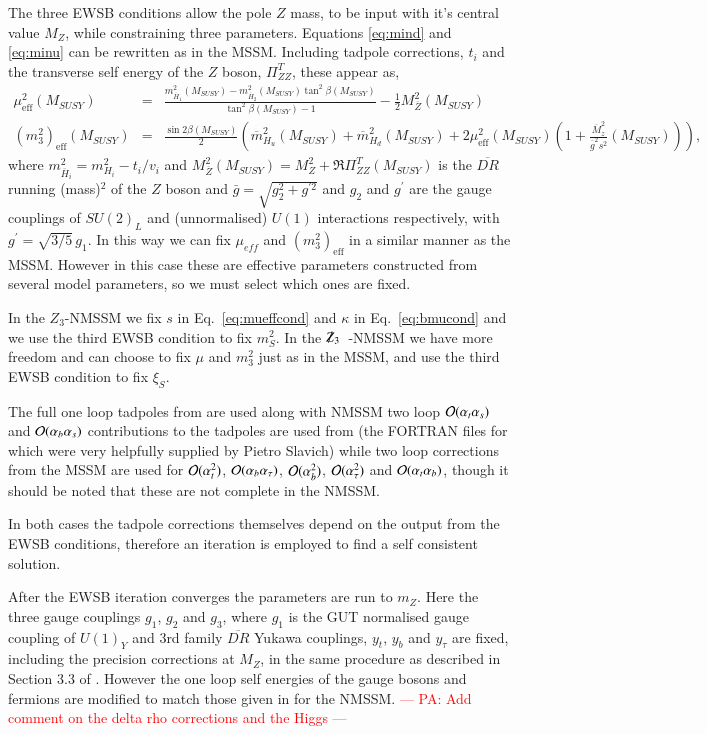 \documentclass[final,3p,times,pdflatex]{elsarticle}
\newcommand{\ba}{\begin{eqnarray}}
\newcommand{\ea}{\end{eqnarray}}
\newcommand{\Zv}{{\mbox{$\slashed{Z}_{3}$}\ }} %
\def\at{\alpha_t}
\def\ab{\alpha_b}
\def\as{\alpha_s}
\def\atau{\alpha_{\tau}}
\def\oatab{{\cal O}(\at\ab)}
\def\oatas{{\cal O}(\at\as)}
\def\oabas{{\cal O}(\ab\as)}
\def\oatq{{\cal O}(\at^2)}
\def\oabq{{\cal O}(\ab^2)}
\def\oatauq{{\cal O}(\atau^2)}
\def\oabatau{{\cal O}(\ab \atau)}
\begin{document}
   The three EWSB conditions allow the pole $Z$ mass, to be input with
   it's central value $M_Z$, while constraining three parameters.
   Equations \ref{eq:mind} and \ref{eq:minu} can be rewritten as in
   the MSSM.  Including tadpole corrections, $t_i$ and the transverse
   self energy of the $Z$ boson, $\Pi^T_{ZZ}$, these appear as, \ba
   \mu_\textrm{eff}^2(M_{SUSY}) &=&
   \frac{m_{\overline{H}_1}^2(M_{SUSY}) -
     m_{\overline{H}_2}^2(M_{SUSY}) \tan^2 \beta(M_{SUSY})}{\tan^2
     \beta(M_{SUSY}) - 1} - \frac{1}{2} M_{\overline Z}^2
   (M_{SUSY})\label{eq:mueffcond}\\ (m^2_3)_\textrm{eff}(M_{SUSY})&=&\frac{\sin{2\beta}(M_{SUSY})}{2}\left(\overline{m}_{H_u}^2(M_{SUSY})+\overline{m}_{H_d}^2(M_{SUSY})+
   2\mu_\textrm{eff}^2(M_{SUSY})\left(1+\frac{\overline{M}_z^2}{\overline{g}^2s^2}(M_{SUSY})\right)\right),\label{eq:bmucond}
   \ea where $m_{\overline{H}_i}^2 = m_{H_i}^2 - t_i/v_i$ and
   $M_{\overline Z}^2(M_{SUSY}) = M_Z^2 + \Re\Pi_{ZZ}^T(M_{SUSY})$ is
   the $\overline{DR}$ running (mass)$^2$ of the $Z$ boson and $\bar g
   = \sqrt{g_2^2+g^{\prime 2}}$ and $g_2$ and $g^{\prime}$ are the
   gauge couplings of $SU(2)_L$ and (unnormalised) $U(1)$ interactions
   respectively, with $g^\prime = \sqrt{3/5} \, g_1$.  In this way we
   can fix $\mu_{eff}$ and $(m^2_3)_\textrm{eff}$ in a similar manner
   as the MSSM.  However in this case these are effective parameters
   constructed from several model parameters, so we must select which
   ones are fixed.

In the $Z_3$-NMSSM we fix $s$ in Eq.~\ref{eq:mueffcond} and $\kappa$
in Eq.~\ref{eq:bmucond} and we use the third EWSB condition to fix
$m_S^2$.  In the \Zv-NMSSM we have more freedom and can choose to fix
$\mu$ and $m_3^2$ just as in the MSSM, and use the third EWSB
condition to fix $\xi_S$.

The full one loop tadpoles from \cite{Degrassi:2009yq} are used along
with NMSSM two loop $\oatas$ and $\oabas$ contributions to the
tadpoles are used from \cite{Degrassi:2009yq} (the FORTRAN files for
which were very helpfully supplied by Pietro Slavich) while two loop
corrections from the MSSM are used for $\oatq$, $\oabatau$, $\oabq$,
$\oatauq$ and $\oatab$, though it should be noted that these are not
complete in the NMSSM.
 
In both cases the tadpole corrections themselves depend on the output
from the EWSB conditions, therefore an iteration is employed to find a
self consistent solution.

After the EWSB iteration converges the parameters are run to $m_Z$.
Here the three gauge couplings $g_1$, $g_2$ and $g_3$, where $g_1$ is
the GUT normalised gauge coupling of $U(1)_Y$ and 3rd family
$\overline{DR}$ Yukawa couplings, $y_t$, $y_b$ and $y_\tau$ are fixed,
including the precision corrections at $M_Z$, in the same procedure as
described in Section 3.3 of \cite{Allanach:2001kg}.  However the one
loop self energies of the gauge bosons and fermions are modified to
match those given in \cite{Degrassi:2009yq} for the NMSSM.
\textcolor{red}{--- PA: Add comment on the delta rho corrections and
  the Higgs ---}
\end{document}

